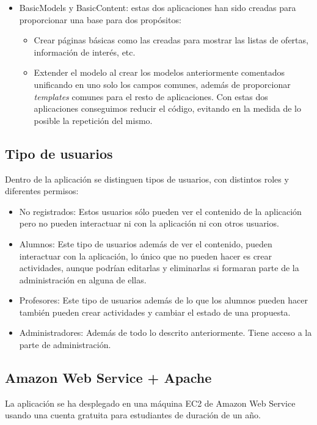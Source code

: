 \begin{itemize}
\item BasicModels y BasicContent: estas dos aplicaciones han sido creadas para proporcionar una base para dos propósitos:
\begin{itemize}
\item Crear páginas básicas como las creadas para mostrar las listas de ofertas, información de interés, etc.
\item Extender el modelo al crear los modelos anteriormente comentados unificando en uno solo los campos comunes, además de proporcionar \textit{templates} comunes para el resto de aplicaciones.
Con estas dos aplicaciones conseguimos reducir el código, evitando en la medida de lo posible la repetición del mismo.
\end{itemize}
\end{itemize}


\subsection{Tipo de usuarios} 
\label{subsec:usuarios}


Dentro de la aplicación se distinguen tipos de usuarios, con distintos roles y diferentes permisos:

\begin{itemize}
\item No registrados: Estos usuarios sólo pueden ver el contenido de la aplicación pero no pueden interactuar ni con la aplicación ni con otros usuarios.
\item Alumnos: Este tipo de usuarios además de ver el contenido, pueden interactuar con la aplicación, lo único que no pueden hacer es crear actividades, aunque podrían editarlas y eliminarlas si formaran parte de la administración en alguna de ellas.
\item Profesores: Este tipo de usuarios además de lo que los alumnos pueden hacer también pueden crear actividades y cambiar el estado de una propuesta.
\item Administradores: Además de todo lo descrito anteriormente. Tiene acceso a la parte de administración.
\end{itemize}


\subsection{Amazon Web Service + Apache} 
\label{subsec:aws_apache}
La aplicación se ha desplegado en una máquina EC2 de Amazon Web Service usando una cuenta gratuita para estudiantes de duración de un año.

